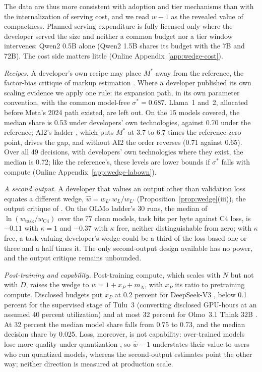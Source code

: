 The data are thus more consistent with adoption and tier mechanisms than with the internalization of serving cost, and we
read $w-1$ as the revealed value of compactness. Planned serving expenditure is fully licensed only where the developer
served the size and neither a common budget nor a tier window intervenes: Qwen2 0.5B alone (Qwen2 1.5B shares its budget
with the 7B and 72B). The cost side matters little (Online Appendix~\ref{app:wedge-cost}).

\textit{Recipes.} A developer's own recipe may place $M^*$ away from the reference, the factor-bias critique of markup
estimation \citep{demirer2020production,raval2023testing}. Where a developer published its own scaling evidence we apply
one rule: its expansion path, in its own parameter convention, with the common model-free $\sigma^*=0.687$. Llama~1
and~2, allocated before Meta's 2024 path existed, are left out. On the 15 models covered, the median share is 0.53 under
developers' own technologies, against 0.70 under the reference; AI2's ladder \citep{bhagia2024establishing}, which puts
$M^*$ at 3.7 to 6.7 times the reference zero point, drives the gap, and without AI2 the order reverses (0.71 against
0.65). Over all 49 decisions, with developers' own technologies where they exist, the median is 0.72; like the
reference's, these levels are lower bounds if $\sigma^*$ falls with compute (Online Appendix~\ref{app:wedge-labown}).

\textit{A second output.} A developer that values an output other than validation loss equates a different wedge,
$\hat w=w_{L'}\,w_L/w_{L'}$ (Proposition~\ref{prop:wedge}(iii)), the output critique of \citet{bond2020unpleasant}. On the
OLMo ladder's 30 runs, the median of $\ln(w_{\mathrm{task}}/w_{\mathrm{C4}})$ over the 77 clean models, task bits per
byte against C4 loss, is $-0.11$ with $\kappa=1$ and $-0.37$ with $\kappa$ free, neither distinguishable from zero; with
$\kappa$ free, a task-valuing developer's wedge could be a third of the loss-based one or three and a half times it. The
only second-output design available has no power, and the output critique remains unbounded.

\textit{Post-training and capability.} Post-training compute, which scales with $N$ but not with $D$, raises the wedge
to $w=1+x_P+m_N$, with $x_P$ its ratio to pretraining compute. Disclosed budgets put $x_P$ at 0.2 percent for DeepSeek-V3
\citep{deepseekai2024deepseekv3}, below 0.1 percent for the supervised stage of T\"ulu~3 \citep{lambert2024tulu3}
(converting disclosed GPU-hours at an assumed 40 percent utilization) and at most 32 percent for Olmo~3.1 Think 32B
\citep{olmo2025olmo3}. At 32 percent the median model share falls from 0.75 to 0.73, and the median decision share by
0.025. Loss, moreover, is not capability: over-trained models lose more quality under quantization
\citep{kumar2024scaling}, so $\hat w-1$ understates their value to users who run quantized models, whereas the
second-output estimates point the other way; neither direction is measured at production scale.

